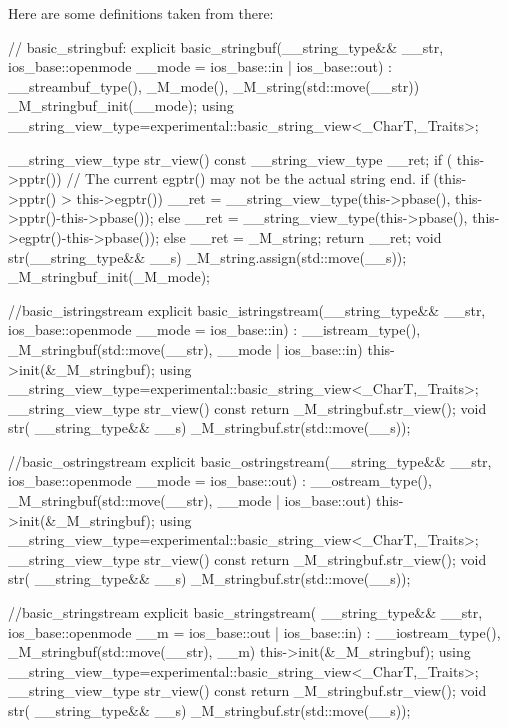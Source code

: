 \documentclass[ebook,11pt,article]{memoir}
\begin{document}
Here are some definitions taken from there:
\begin{codeblock}
// basic_stringbuf:
      explicit
      basic_stringbuf(__string_type&& __str,
		      ios_base::openmode __mode = ios_base::in | ios_base::out)
      : __streambuf_type(), _M_mode(), _M_string(std::move(__str))
      { _M_stringbuf_init(__mode); }
  	using __string_view_type=experimental::basic_string_view<_CharT,_Traits>;

      __string_view_type str_view() const {
      	__string_view_type __ret{};
      	if ( this->pptr())  {
      	    // The current egptr() may not be the actual string end.
      	    if (this->pptr() > this->egptr())
      	      __ret = __string_view_type(this->pbase(), this->pptr()-this->pbase());
      	    else
       	      __ret = __string_view_type(this->pbase(), this->egptr()-this->pbase());
      	  }
      	else {
      		__ret = _M_string;
      	}
      	return __ret;
      }
     void
      str(__string_type&& __s)
      {
	_M_string.assign(std::move(__s));
	_M_stringbuf_init(_M_mode);
      }

//basic_istringstream
      explicit
      basic_istringstream(__string_type&& __str,
			  ios_base::openmode __mode = ios_base::in)
      : __istream_type(), _M_stringbuf(std::move(__str), __mode | ios_base::in)
      { this->init(&_M_stringbuf); }
  	using __string_view_type=experimental::basic_string_view<_CharT,_Traits>;
      __string_view_type
      str_view() const
      { return _M_stringbuf.str_view(); }
      void
      str( __string_type&& __s)
      { _M_stringbuf.str(std::move(__s)); }

//basic_ostringstream
      explicit
      basic_ostringstream(__string_type&& __str,
			  ios_base::openmode __mode = ios_base::out)
      : __ostream_type(), _M_stringbuf(std::move(__str), __mode | ios_base::out)
      { this->init(&_M_stringbuf); }
  	using __string_view_type=experimental::basic_string_view<_CharT,_Traits>;
      __string_view_type
      str_view() const
      { return _M_stringbuf.str_view(); }
      void
      str( __string_type&& __s)
      { _M_stringbuf.str(std::move(__s)); }

//basic_stringstream
      explicit
      basic_stringstream( __string_type&& __str,
			 ios_base::openmode __m = ios_base::out | ios_base::in)
      : __iostream_type(), _M_stringbuf(std::move(__str), __m)
      { this->init(&_M_stringbuf); }
  	using __string_view_type=experimental::basic_string_view<_CharT,_Traits>;
      __string_view_type
      str_view() const
      { return _M_stringbuf.str_view(); }
      void
      str( __string_type&& __s)
      { _M_stringbuf.str(std::move(__s)); }

\end{codeblock}
\end{document}
